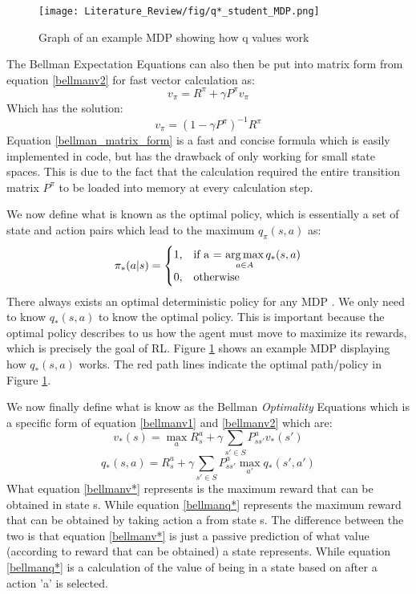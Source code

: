 \begin{figure}[!htb]
	\centering
	\texttt{[image: Literature\_Review/fig/q*\_student\_MDP.png]}
	\caption{Graph of an example MDP showing how q values work\cite{David_Silver}}
	\label{fig:q*}
	\centering
\end{figure}
The Bellman Expectation Equations can also then be put into matrix form from equation \ref{bellmanv2} for fast vector calculation as:
\begin{equation}
	v_\pi = R^{\pi} + \gamma P^{\pi}v_\pi
\end{equation}
Which has the solution:
\begin{equation}
	v_\pi = (1 - \gamma P^{\pi})^{-1}R^{\pi}
	\label{bellman_matrix_form}
\end{equation}
Equation \ref{bellman_matrix_form} is a fast and concise formula which is easily implemented in code, but has the drawback of only working for small state spaces. This is due to the fact that the calculation required the entire transition matrix $P^\pi$ to be loaded into memory at every calculation step.

We now define what is known as the optimal policy, which is essentially a set of state and action pairs which lead to the maximum $q_\pi(s,a)$ as:
\begin{align}
	\pi_{*}(a|s)=\begin{cases}
		1, & \text{if a = $\operatorname*{arg\,max}\limits_{a \in A}q_* (s,a)$}\\
		0, & \text{otherwise}
	\end{cases}
	\label{eq:pi_*}
\end{align}
There always exists an optimal deterministic policy for any MDP \cite{sutton_barto}. We only need to know $q_* (s,a)$ to know the optimal policy. This is important because the optimal policy describes to us how the agent must move to maximize its rewards, which is precisely the goal of RL. Figure \ref{fig:q*} shows an example MDP displaying how $q_* (s,a)$ works. The red path lines indicate the optimal path/policy in Figure \ref{fig:q*}.

We now finally define what is know as the Bellman \textit{Optimality} Equations which is a specific form of equation \ref{bellmanv1} and \ref{bellmanv2} which are:
\begin{equation}
	v_*(s) = \max\limits_{a}R^{a}_s+\gamma\sum_{s'\in S}P^{a}_{ss'}v_*(s')
	\label{bellmanv*}
\end{equation}
\begin{equation}
	q_*(s,a) = R^{a}_s +\gamma \sum_{s'\in S}P^{a}_{ss'}\max\limits_{a'}q_*(s',a')
	\label{bellmanq*}
\end{equation}
What equation \ref{bellmanv*} represents is the maximum reward that can be obtained in state s. While equation \ref{bellmanq*} represents the maximum reward that can be obtained by taking action a from state s. The difference between the two is that equation \ref{bellmanv*} is just a passive prediction of what value (according to reward that can be obtained) a state represents. While equation \ref{bellmanq*} is a calculation of the value of being in a state based on after a action 'a' is selected.

